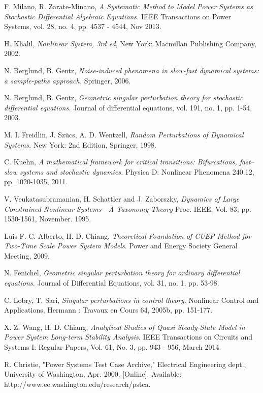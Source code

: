 \documentclass[journal]{IEEEtran}
\begin{document}
\begin{thebibliography}{1}
F. Milano, R. Zarate-Minano, {\em A Systematic Method to Model Power Systems as Stochastic Differential Algebraic Equations.}
\newblock IEEE Transactions on Power Systems, vol. 28, no. 4, pp. 4537 - 4544, Nov 2013.

H. Khalil, {\em Nonlinear System, 3rd ed},
\newblock New York: Macmillan Publishing Company, 2002.



N. Berglund, B. Gentz, {\em Noise-induced phenomena in slow-fast dynamical systems: a sample-paths approach.} \newblock Springer, 2006.

N. Berglund, B. Gentz, {\em Geometric singular perturbation theory for stochastic differential equations.}
\newblock Journal of differential equations, vol. 191, no. 1, pp. 1-54, 2003.

M. I. Freidlin, J. Szücs, A. D. Wentzell, {\em Random Perturbations of Dynamical Systems.}
\newblock New York: 2nd Edition, Springer, 1998.

C. Kuehn, {\em A mathematical framework for critical transitions: Bifurcations, fast–slow systems and stochastic dynamics.}
\newblock Physica D: Nonlinear Phenomena 240.12, pp. 1020-1035, 2011.




V.  Veukatasubramanian, H.  Schattler  and  J.  Zaborszky, {\em Dynamics of Large Constrained Nonlinear Systems---A Taxonomy Theory}
\newblock Proc. IEEE, Vol. 83, pp. 1530-1561, November. 1995.

Luis F. C. Alberto, H. D. Chiang, {\em Theoretical Foundation of CUEP Method for Two-Time Scale Power System Models}.
\newblock Power and Energy Society General Meeting, 2009.


N. Fenichel, {\em Geometric singular perturbation theory for ordinary differential equations.}
\newblock Journal of Differential Equations, vol. 31, no. 1, pp. 53-98.


C. Lobry, T. Sari, {\em Singular perturbations in control theory}.
\newblock Nonlinear Control and Applications, Hermann : Travaux en Cours 64, 2005b, pp. 151-177.


X. Z. Wang, H. D. Chiang,
{\em Analytical Studies of Quasi Steady-State Model in Power System Long-term Stability Analysis}.
\newblock IEEE Transactions on Circuits and Systems I: Regular Papers, Vol. 61, No. 3, pp. 943 - 956, March 2014.


















R. Christie, "Power Systems Test Case Archive," Electrical Engineering
dept., University of Washington, Apr. 2000. [Online]. Available:
http://www.ee.washington.edu/research/pstca.

\end{thebibliography}
\end{document}
